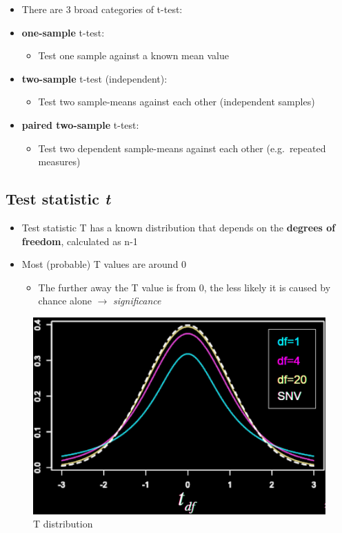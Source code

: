 \documentclass[
]{book}
\providecommand{\tightlist}{%
  \setlength{\itemsep}{0pt}\setlength{\parskip}{0pt}}
\begin{document}
\begin{itemize}
\item
  There are 3 broad categories of t-test:
\item
  \textbf{one-sample} t-test:

  \begin{itemize}
  \tightlist
  \item
    Test one sample against a known mean value
  \end{itemize}
\item
  \textbf{two-sample} t-test (independent):

  \begin{itemize}
  \tightlist
  \item
    Test two sample-means against each other (independent samples)
  \end{itemize}
\item
  \textbf{paired two-sample} t-test:

  \begin{itemize}
  \tightlist
  \item
    Test two dependent sample-means against each other (e.g.~repeated measures)
  \end{itemize}
\end{itemize}

\subsection{\texorpdfstring{Test statistic \emph{t}}{Test statistic t}}\label{test-statistic-t}

\begin{itemize}
\tightlist
\item
  Test statistic T has a known distribution that depends on the \textbf{degrees of freedom}, calculated as n-1
\item
  Most (probable) T values are around 0

  \begin{itemize}
  \tightlist
  \item
    The further away the T value is from 0, the less likely it is caused by chance alone \(\rightarrow\) \emph{significance}
  \end{itemize}
\end{itemize}

\begin{figure}
\centering
\includegraphics{./img/tdist.png}
\caption{T distribution}
\end{figure}
\end{document}
